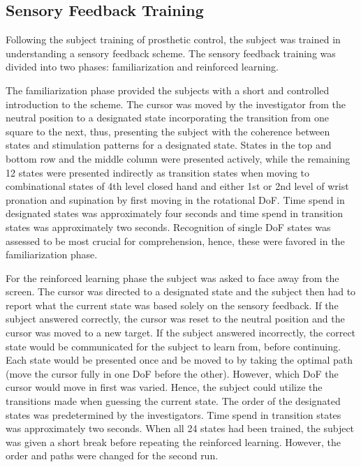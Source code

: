 \subsection{Sensory Feedback Training}

Following the subject training of prosthetic control, the subject was trained in understanding a sensory feedback scheme. The sensory feedback training was divided into two phases: familiarization and reinforced learning. 

The familiarization phase provided the subjects with a short and controlled introduction to the scheme. The cursor was moved by the investigator from the neutral position to a designated state incorporating the transition from one square to the next, thus, presenting the subject with the coherence between states and stimulation patterns for a designated state. States in the top and bottom row and the middle column were presented actively, while the remaining 12 states were presented indirectly as transition states when moving to combinational states of 4th level closed hand and either 1st or 2nd level of wrist pronation and supination by first moving in the rotational DoF. Time spend in designated states was approximately four seconds and time spend in transition states was approximately two seconds. Recognition of single DoF states was assessed to be most crucial for comprehension, hence, these were favored in the familiarization phase. 

For the reinforced learning phase the subject was asked to face away from the screen. The cursor was directed to a designated state and the subject then had to report what the current state was based solely on the sensory feedback. If the subject answered correctly, the cursor was reset to the neutral position and the cursor was moved to a new target. If the subject answered incorrectly, the correct state would be communicated for the subject to learn from, before continuing. Each state would be presented once and be moved to by taking the optimal path (move the cursor fully in one DoF before the other). However, which DoF the cursor would move in first was varied. Hence, the subject could utilize the transitions made when guessing the current state. The order of the designated states was predetermined by the investigators. Time spend in transition states was approximately two seconds. When all 24 states had been trained, the subject was given a short break before repeating the reinforced learning. However, the order and paths were changed for the second run.